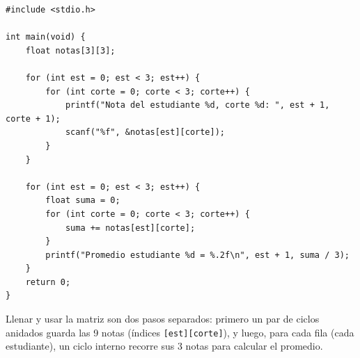 \documentclass[11pt,letterpaper]{article}
\begin{document}
\begin{lstlisting}
#include <stdio.h>

int main(void) {
    float notas[3][3];

    for (int est = 0; est < 3; est++) {
        for (int corte = 0; corte < 3; corte++) {
            printf("Nota del estudiante %d, corte %d: ", est + 1, corte + 1);
            scanf("%f", &notas[est][corte]);
        }
    }

    for (int est = 0; est < 3; est++) {
        float suma = 0;
        for (int corte = 0; corte < 3; corte++) {
            suma += notas[est][corte];
        }
        printf("Promedio estudiante %d = %.2f\n", est + 1, suma / 3);
    }
    return 0;
}
\end{lstlisting}
Llenar y usar la matriz son dos pasos separados: primero un par de ciclos anidados guarda las 9
notas (índices \texttt{[est][corte]}), y luego, para cada fila (cada estudiante), un ciclo interno
recorre sus 3 notas para calcular el promedio.
\end{document}
